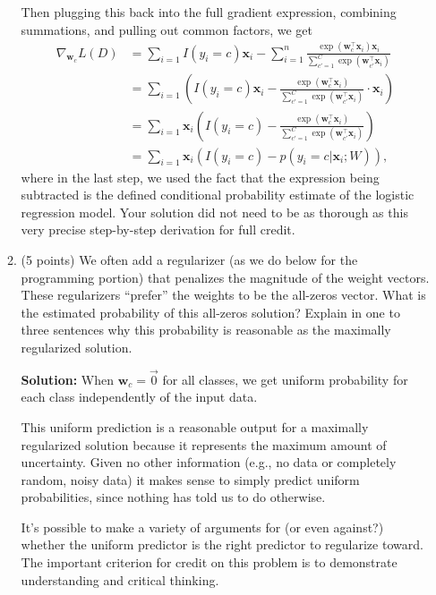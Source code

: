 \documentclass[10pt]{article}
\newcommand{\bx}{{\boldsymbol x}}
\newcommand{\bw}{{\boldsymbol w}}
\newcommand{\solution}[1]{{\color{PineGreen} \textbf{Solution:} #1}}
\begin{document}
\begin{enumerate}
\begin{enumerate}
{Then plugging this back into the full gradient expression, combining summations, and pulling out common factors, we get
\begin{equation}
\begin{aligned}
\nabla_{\bw_c} L(D) &= \sum_{i = 1} I(y_i = c) \bx_i - \sum_{i=1}^n \frac{\exp(\bw_{c}^\top \bx_i) \bx_i}{\sum_{c' = 1}^C \exp(\bw_{c'}^\top \bx_i)}\\
&= \sum_{i = 1} \left( I(y_i = c) \bx_i -  \frac{\exp(\bw_{c}^\top \bx_i)}{\sum_{c' = 1}^C \exp(\bw_{c'}^\top \bx_i)} \cdot \bx_i \right)\\
&= \sum_{i = 1} \bx_i \left( I(y_i = c) -  \frac{\exp(\bw_{c}^\top \bx_i)}{\sum_{c' = 1}^C \exp(\bw_{c'}^\top \bx_i)} \right)\\
&= \sum_{i = 1} \bx_i \left( I(y_i = c) -  p(y_i = c |\bx_i ; W) \right),
\end{aligned}
\end{equation}
where in the last step, we used the fact that the expression being subtracted is the defined conditional probability estimate of the logistic regression model. Your solution did not need to be as thorough as this very precise step-by-step derivation for full credit.
}


\item (5 points) We often add a regularizer (as we do below for the programming portion) that penalizes the magnitude of the weight vectors. These regularizers ``prefer'' the weights to be the all-zeros vector. What is the estimated probability of this all-zeros solution? Explain in one to three sentences why this probability is reasonable as the maximally regularized solution.

\solution{
When $\bw_c = \vec{0}$ for all classes, we get uniform probability for each class independently of the input data. 

This uniform prediction is a reasonable output for a maximally regularized solution because it represents the maximum amount of uncertainty. Given no other information (e.g., no data or completely random, noisy data) it makes sense to simply predict uniform probabilities, since nothing has told us to do otherwise. 

It's possible to make a variety of arguments for (or even against?) whether the uniform predictor is the right predictor to regularize toward. The important criterion for credit on this problem is to demonstrate understanding and critical thinking. 
}

\end{enumerate}

\end{enumerate}
\end{document}
